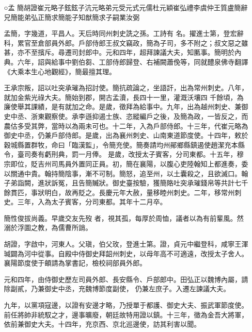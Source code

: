 
\begin{pinyinscope}

 ○孟
 簡胡證崔元略子鉉鉉子沆元略弟元受元式元儒杜元穎崔弘禮李虞仲王質盧簡辭兄簡能弟弘正簡求簡能子知猷簡求子嗣業汝弼



 孟簡，字幾道，平昌人。天后時同州刺史詵之孫。工詩有
 名。擢進士第，登宏辭科，累官至倉部員外郎。戶部侍郎王叔文竊政，簡為子司，多不附之；叔文惡之雖甚，亦不至擯斥。尋遷司封郎中。元和四年，超拜諫議大夫，知匭事。簡明於內典。六年，詔與給事中劉伯芻、工部侍郎歸登、右補闕蕭俛等，同就醴泉佛寺翻譯《大乘本生心地觀經》，簡最擅其理。



 王承宗叛，詔以吐突承璀為招討使。簡抗疏論之，坐語訐，出為常州刺史。八年，就加金紫光祿大夫。簡始到郡，開古孟瀆，長四十一里，灌溉沃壤四
 千餘頃，為廉使舉其課績，是有就加之命。是歲，徵拜為給事中。九年，出為越州刺史、兼御史中丞、浙東觀察使。承李遜抑遏士族、恣縱編戶之後，及簡為政，一皆反之，而農估多受其弊，當時以為兩未可也。十二年，入為戶部侍郎。十三年，代崔元略為御史中丞，仍兼戶部侍郎。是歲，出為襄州刺史、山南東道節度使。十四年，敕於穀城縣置群牧，命曰「臨漢監」，令簡充使。簡奏請均州鄖鄉縣鎮遏使趙潔充本縣令，臺司奏有虧刑典，罰一月俸。
 是歲，改授太子賓客，分司東都。十五年，穆宗即位，貶吉州司馬員外置同正員。初，簡在襄陽，以腹心吏陸翰知上都進奏，委以關通中貴。翰持簡陰事，漸不可制。簡怒，追至州，以土囊殺之，且欲滅口。翰子弟詣闕，進狀訴冤，且告簡贓狀。御史臺按驗，獲簡賂吐突承璀錢帛等共計七千餘貫匹，事狀明白，故再貶之。長慶元年大赦，量移睦州刺史。二年，移常州刺史。三年，入為太子賓客，分司東都。其年十二月卒。



 簡性俊拔尚義。早歲交友先歿
 者，視其孤，每厚於周恤，議者以為有前輩風。然溺於浮圖之教，為儒曹所誚。



 胡證，字啟中，河東人。父瑱，伯父玫，登進士第。證，貞元中繼登科，咸寧王渾瑊闢為河中從事。自殿中侍御史拜韶州刺史，以母年高不可適遠，改授太子舍人。襄陽節度使于頔請為掌書記，檢校祠部員外郎。



 元和四年，由侍御史歷左司員外郎、長安縣令、戶部郎中。田弘正以魏博內屬，請除副貳，乃兼御史中丞，充魏博節度副使，
 仍兼左庶子。入遷左諫議大夫。



 九年，以黨項寇邊，以證有安邊才略，乃授單于都護、御史大夫、振武軍節度使。前任將帥非統馭之才，邊事曠廢，朝廷故特用證以鎮。十三年，徵為金吾大將軍，依前兼御史大夫。十四年，充京西、京北巡邊使，訪其利害以聞。




\end{pinyinscope}

